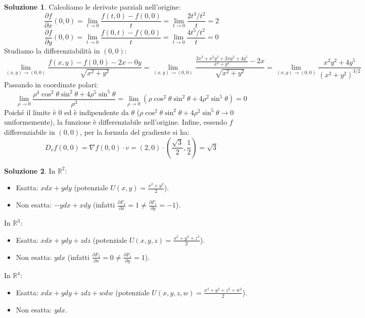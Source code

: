 \documentclass[12pt,a4paper]{article}
\theoremstyle{definition}
\newtheorem{sol}{Soluzione}
\begin{document}
\begin{sol}
    Calcoliamo le derivate parziali nell'origine:
    \[
        \frac{\partial f}{\partial x}(0,0) = \lim_{t \to 0} \frac{f(t,0) - f(0,0)}{t} = \lim_{t \to 0} \frac{2t^3/t^2}{t} = 2
    \]
    \[
        \frac{\partial f}{\partial y}(0,0) = \lim_{t \to 0} \frac{f(0,t) - f(0,0)}{t} = \lim_{t \to 0} \frac{4t^5/t^2}{t} = 0
    \]
    Studiamo la differenziabilità in $(0,0)$:
    \[
        \lim_{(x,y) \to (0,0)} \frac{f(x,y) - f(0,0) - 2x - 0y}{\sqrt{x^2+y^2}} = \lim_{(x,y) \to (0,0)} \frac{\frac{2x^3+x^2y^2+2xy^2+4y^5}{x^2+y^2} - 2x}{\sqrt{x^2+y^2}} = \lim_{(x,y) \to (0,0)} \frac{x^2y^2+4y^5}{(x^2+y^2)^{3/2}}
    \]
    Passando in coordinate polari:
    \[
        \lim_{\rho \to 0} \frac{\rho^4 \cos^2 \theta \sin^2 \theta + 4\rho^5 \sin^5 \theta}{\rho^3} = \lim_{\rho \to 0} (\rho \cos^2 \theta \sin^2 \theta + 4\rho^2 \sin^5 \theta) = 0
    \]
    Poiché il limite è $0$ ed è indipendente da $\theta$ ($\rho \cos^2\theta \sin^2\theta + 4\rho^2 \sin^5\theta \to 0$ uniformemente), la funzione è differenziabile nell'origine.
    Infine, essendo $f$ differenziabile in $(0,0)$, per la formula del gradiente si ha:
    \[
        D_v f(0,0) = \nabla f(0,0) \cdot v = (2, 0) \cdot \left(\frac{\sqrt{3}}{2}, \frac{1}{2}\right) = \sqrt{3}
    \]
\end{sol}

\begin{sol}
    In $\mathbb{R}^2$:
    \begin{itemize}
        \item Esatta: $x dx + y dy$ (potenziale $U(x,y) = \frac{x^2+y^2}{2}$).
        \item Non esatta: $-y dx + x dy$ (infatti $\frac{\partial F_2}{\partial x} = 1 \neq \frac{\partial F_1}{\partial y} = -1$).
    \end{itemize}
    In $\mathbb{R}^3$:
    \begin{itemize}
        \item Esatta: $x dx + y dy + z dz$ (potenziale $U(x,y,z) = \frac{x^2+y^2+z^2}{2}$).
        \item Non esatta: $y dx$ (infatti $\frac{\partial F_2}{\partial x} = 0 \neq \frac{\partial F_1}{\partial y} = 1$).
    \end{itemize}
    In $\mathbb{R}^4$:
    \begin{itemize}
        \item Esatta: $x dx + y dy + z dz + w dw$ (potenziale $U(x,y,z,w) = \frac{x^2+y^2+z^2+w^2}{2}$).
        \item Non esatta: $y dx$.
    \end{itemize}
\end{sol}
\end{document}

